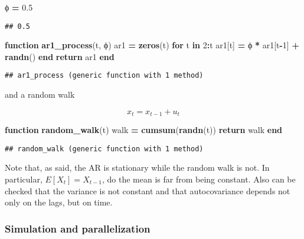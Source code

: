 \documentclass[
]{article}
\newenvironment{Shaded}{\begin{snugshade}}{\end{snugshade}}
\newcommand{\ControlFlowTok}[1]{\textcolor[rgb]{0.13,0.29,0.53}{\textbf{#1}}}
\newcommand{\FloatTok}[1]{\textcolor[rgb]{0.00,0.00,0.81}{#1}}
\newcommand{\FunctionTok}[1]{\textcolor[rgb]{0.13,0.29,0.53}{\textbf{#1}}}
\newcommand{\KeywordTok}[1]{\textcolor[rgb]{0.13,0.29,0.53}{\textbf{#1}}}
\newcommand{\NormalTok}[1]{#1}
\newcommand{\OperatorTok}[1]{\textcolor[rgb]{0.81,0.36,0.00}{\textbf{#1}}}
\begin{document}
\begin{Shaded}
\begin{Highlighting}[]
\NormalTok{ϕ }\OperatorTok{=} \FloatTok{0.5}
\end{Highlighting}
\end{Shaded}

\begin{verbatim}
## 0.5
\end{verbatim}

\begin{Shaded}
\begin{Highlighting}[]
\KeywordTok{function} \FunctionTok{ar1\_process}\NormalTok{(t, ϕ)}
\NormalTok{    ar1 }\OperatorTok{=} \FunctionTok{zeros}\NormalTok{(t)}
    \ControlFlowTok{for}\NormalTok{ t }\KeywordTok{in} \FloatTok{2}\OperatorTok{:}\NormalTok{t}
\NormalTok{        ar1[t] }\OperatorTok{=}\NormalTok{ ϕ }\OperatorTok{*}\NormalTok{ ar1[t}\OperatorTok{{-}}\FloatTok{1}\NormalTok{] }\OperatorTok{+} \FunctionTok{randn}\NormalTok{()}
    \ControlFlowTok{end}
    \ControlFlowTok{return}\NormalTok{ ar1}
\KeywordTok{end}
\end{Highlighting}
\end{Shaded}

\begin{verbatim}
## ar1_process (generic function with 1 method)
\end{verbatim}

and a random walk

\[
x_t = x_{t-1} + u_t
\]

\begin{Shaded}
\begin{Highlighting}[]
\KeywordTok{function} \FunctionTok{random\_walk}\NormalTok{(t)}
\NormalTok{    walk }\OperatorTok{=} \FunctionTok{cumsum}\NormalTok{(}\FunctionTok{randn}\NormalTok{(t))}
    \ControlFlowTok{return}\NormalTok{ walk}
\KeywordTok{end}
\end{Highlighting}
\end{Shaded}

\begin{verbatim}
## random_walk (generic function with 1 method)
\end{verbatim}

Note that, as said, the AR is stationary while the random walk is not.
In particular, \(E[X_t] = X_{t-1}\), do the mean is far from being
constant. Also can be checked that the variance is not constant and that
autocovariance depends not only on the lags, but on time.

\hypertarget{simulation-and-parallelization}{%
\subsubsection{Simulation and
parallelization}\label{simulation-and-parallelization}}
\end{document}
